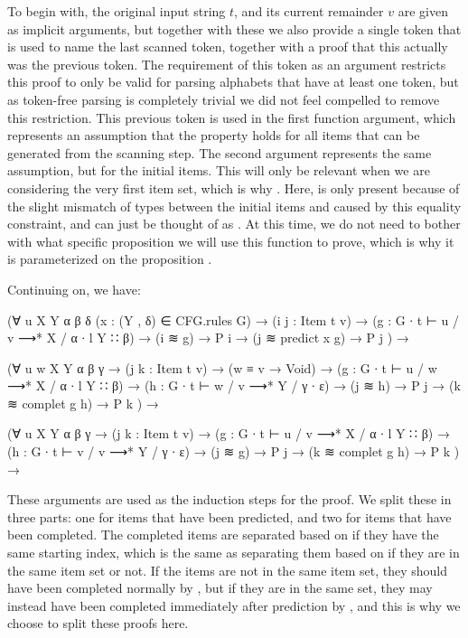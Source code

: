 		To begin with, the original input string $t$, and its current remainder
		$v$ are given as implicit arguments, but together with these we also
		provide a single token that is used to name the last scanned token,
		together with a proof that this actually was the previous token.  The
		requirement of this token as an argument restricts this proof to only
		be valid for parsing alphabets that have at least one token, but as
		token-free parsing is completely trivial we did not feel compelled to
		remove this restriction. This previous token is used in the first
		function argument, which represents an assumption that the property
		 holds for all items that can be generated from the scanning
		step. The second argument represents the same assumption, but for the
		initial items. This will only be relevant when we are considering the
		very first item set, which is why . Here,
		 is only present because of the slight mismatch of
		types between the initial items and  caused by this equality
		constraint, and can just be thought of as . At this time,
		we do not need to bother with what specific proposition we will use
		this function to prove, which is why it is parameterized on the
		proposition .

		Continuing on, we have:

		\begin{code}
			    (∀ {u X Y α β δ} (x : (Y , δ) ∈ CFG.rules G) →
			      (i j : Item t v) →
			      (g : G ∙ t ⊢ u / v ⟶* X / α ∙ l Y ∷ β) →
			      (i ≋ g) → P i →
			      (j ≋ predict x g) → P j
			    ) →
			
			    (∀ {u w X Y α β γ} →
			      (j k : Item t v) →
			      (w ≡ v → Void) →
			      (g : G ∙ t ⊢ u / w ⟶* X / α ∙ l Y ∷ β) →
			      (h : G ∙ t ⊢ w / v ⟶* Y / γ ∙ ε) →
			      (j ≋ h) → P j →
			      (k ≋ complet g h) → P k
			    ) →
			
			    (∀ {u X Y α β γ} →
			      (j k : Item t v) →
			      (g : G ∙ t ⊢ u / v ⟶* X / α ∙ l Y ∷ β) →
			      (h : G ∙ t ⊢ v / v ⟶* Y / γ ∙ ε) →
			      (j ≋ g) → P j →
			      (k ≋ complet g h) → P k
			    ) →
		\end{code}

		These arguments are used as the induction steps for the proof. We split
		these in three parts: one for items that have been predicted, and two
		for items that have been completed. The completed items are separated 
		based on if they have the same starting index, which is the same as 
		separating them based on if they are in the same item set or not. If 
		the items are not in the same item set, they should have been completed
		normally by , but if they are in the same set, they may 
		instead have been completed immediately after prediction by 
		, and this is why we choose to split these proofs 
		here.

